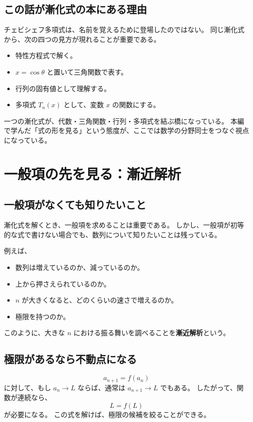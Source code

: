 \subsection{この話が漸化式の本にある理由}

チェビシェフ多項式は、名前を覚えるために登場したのではない。
同じ漸化式から、次の四つの見方が現れることが重要である。

\begin{itemize}
  \item 特性方程式で解く。
  \item $x=\cos\theta$ と置いて三角関数で表す。
  \item 行列の固有値として理解する。
  \item 多項式 $T_n(x)$ として、変数 $x$ の関数にする。
\end{itemize}

一つの漸化式が、代数・三角関数・行列・多項式を結ぶ橋になっている。
本編で学んだ「式の形を見る」という態度が、ここでは数学の分野同士をつなぐ視点になっている。

\section{一般項の先を見る：漸近解析}

\subsection{一般項がなくても知りたいこと}

漸化式を解くとき、一般項を求めることは重要である。
しかし、一般項が初等的な式で書けない場合でも、数列について知りたいことは残っている。

例えば、
\begin{itemize}
  \item 数列は増えているのか、減っているのか。
  \item 上から押さえられているのか。
  \item $n$ が大きくなると、どのくらいの速さで増えるのか。
  \item 極限を持つのか。
\end{itemize}

このように、大きな $n$ における振る舞いを調べることを\textbf{漸近解析}という。

\subsection{極限があるなら不動点になる}

\[
  a_{n+1}=f(a_n)
\]
に対して、もし $a_n\to L$ ならば、通常は $a_{n+1}\to L$ でもある。
したがって、関数が連続なら、
\[
  L=f(L)
\]
が必要になる。
この式を解けば、極限の候補を絞ることができる。


